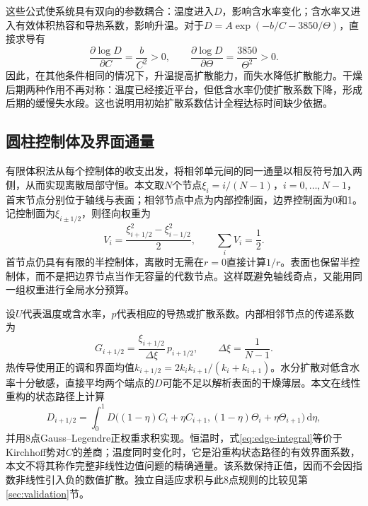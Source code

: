 这些公式使系统具有双向的参数耦合：温度进入$D$，影响含水率变化；含水率又进入有效体积热容和导热系数，影响升温。对于$D=A\exp(-b/C-3850/\Theta)$，直接求导有
\begin{equation}
 \frac{\partial\log D}{\partial C}=\frac b{C^2}>0,
 \qquad \frac{\partial\log D}{\partial\Theta}
 =\frac{3850}{\Theta^2}>0.\label{eq:derivatives}
\end{equation}
因此，在其他条件相同的情况下，升温提高扩散能力，而失水降低扩散能力。干燥后期两种作用不再对称：温度已经接近平台，但低含水率仍使扩散系数下降，形成后期的缓慢失水段。这也说明用初始扩散系数估计全程达标时间缺少依据。

\subsection{圆柱控制体及界面通量}
有限体积法从每个控制体的收支出发，将相邻单元间的同一通量以相反符号加入两侧，从而实现离散局部守恒\cite{eymard2000}。本文取$N$个节点$\xi_i=i/(N-1)$，$i=0,\ldots,N-1$，首末节点分别位于轴线与表面；相邻节点中点为内部控制面，边界控制面为0和1。记控制面为$\xi_{i\pm1/2}$，则径向权重为
\begin{equation}
 V_i=\frac{\xi_{i+1/2}^2-\xi_{i-1/2}^2}{2},
 \qquad \sum_iV_i=\frac12.\label{eq:weights}
\end{equation}
首节点仍具有有限的半控制体，离散时无需在$r=0$直接计算$1/r$。表面也保留半控制体，而不是把边界节点当作无容量的代数节点。这样既避免轴线奇点，又能用同一组权重进行全局水分预算。

设$U$代表温度或含水率，$p$代表相应的导热或扩散系数。内部相邻节点的传递系数为
\begin{equation}
 G_{i+1/2}=\frac{\xi_{i+1/2}}{\Delta\xi}\,p_{i+1/2},
 \qquad \Delta\xi=\frac1{N-1}.\label{eq:conductance}
\end{equation}
热传导使用正的调和界面均值$k_{i+1/2}=2k_ik_{i+1}/(k_i+k_{i+1})$。水分扩散对低含水率十分敏感，直接平均两个端点的$D$可能不足以解析表面的干燥薄层。本文在线性重构的状态路径上计算
\begin{equation}
 D_{i+1/2}=\int_0^1D\bigl((1-\eta)C_i+\eta C_{i+1},
 (1-\eta)\Theta_i+\eta\Theta_{i+1}\bigr)\,\mathrm d\eta,
 \label{eq:edge-integral}
\end{equation}
并用8点Gauss--Legendre正权重求积实现。恒温时，式\eqref{eq:edge-integral}等价于Kirchhoff势对$C$的差商；温度同时变化时，它是沿重构状态路径的有效界面系数，本文不将其称作完整非线性边值问题的精确通量。该系数保持正值，因而不会因指数非线性引入负的数值扩散。独立自适应求积与此8点规则的比较见第\ref{sec:validation}节。

